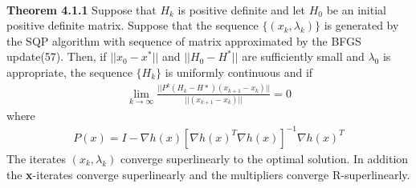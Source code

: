 \documentclass{article}
\begin{document}
\begin{spacing}{1.5}
~\\
\textbf{Theorem 4.1.1}  Suppose that $H_k$ is positive definite and let $H_0$ be an initial positive definite matrix. Suppose that the sequence $\{(x_k,\lambda_k)\}$ is generated by the SQP algorithm with sequence of matrix approximated by the BFGS update(57). Then, if $||x_0-x^*||$ and $||H_0-H^*||$ are sufficiently small and $\lambda_0$ is appropriate, the sequence $\{H_k\}$ is uniformly continuous and if
\begin{align}
\lim_{k\to\infty} \frac{||P^k(H_k-H*)(x_{k+1}-x_k)||}{||(x_{k+1}-x_k)||}=0
\end{align}
where
\begin{align}
P(x)=I-\nabla h(x)[\nabla h(x)^T\nabla h(x)]^{-1}\nabla h(x)^T
\end{align}
The iterates $(x_k,\lambda_k)$ converge superlinearly to the optimal solution. In addition the \textbf{x}-iterates converge superlinearly and the multipliers converge R-superlinearly.\\


\end{spacing}
\end{document}

